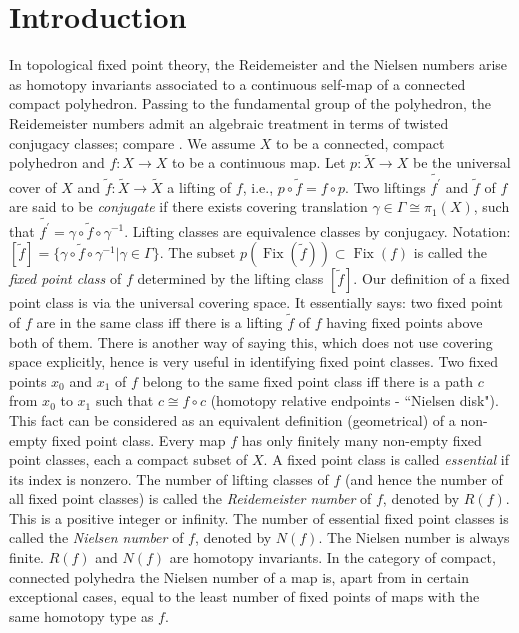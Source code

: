 \documentclass[12pt, a4paper]{amsart}
\DeclareMathOperator{\fix}{Fix}
\begin{document}
\section{Introduction}\label{sec:intro}
In topological fixed point theory,  the Reidemeister and  the Nielsen numbers
arise as homotopy invariants associated to  a continuous
self-map of a connected compact polyhedron.  Passing to the
fundamental group of the polyhedron, the Reidemeister numbers admit an
algebraic treatment in terms of twisted conjugacy classes; compare
\cite{FelshB}.
We assume $X$ to be a connected, compact polyhedron and $f:X\rightarrow X$ to be a continuous map. Let $p:\tilde{X}\rightarrow X$ be the universal cover of $X$ and $\tilde{f}:\tilde{X}\rightarrow \tilde{X}$ a lifting
of $f$, {i.e.,} $p\circ\tilde{f}=f\circ p$.
 Two liftings $\tilde{f^\prime}$ and $\tilde{f}$  of $f$ are said to be \emph{conjugate} if there
 exists covering translation $ \gamma \in \Gamma\cong\pi_1(X)$, such that $\tilde{f^\prime}= \gamma \circ \tilde{f} \circ  \gamma^{-1}.$
Lifting classes are equivalence classes by conjugacy. Notation:
$
[\tilde{f}]= \{ \gamma \circ \tilde{f} \circ  \gamma^{-1}  |\gamma \in \Gamma \}.
$
The subset $p(\fix(\tilde{f}))\subset \fix(f)$ is called the \emph{fixed point class} of $f$ determined by the lifting class $[\tilde{f}]$.
 Our definition of a fixed point class is via the universal covering space. It essentially
 says: two fixed point of $f$ are in the same class iff there is a lifting $\tilde f $ of $f$ having
 fixed points above both of them. There is another way of saying this, which does not use covering space explicitly, hence is  very useful in identifying fixed point classes.
 Two fixed points $x_0$ and $x_1$ of $f$ belong to the same fixed point class iff
 there is a path $c$ from $x_0$ to $x_1$ such that $c \cong f\circ c $ (homotopy relative
    endpoints - ``Nielsen disk").
 This fact  can be considered as an equivalent definition (geometrical) of a non-empty fixed point class. Every map $f$  has only finitely many non-empty fixed point classes, each a compact
 subset of $X$.
 A fixed point class is called \emph{essential} if its index is nonzero. The number of lifting classes of $f$ (and hence the number of all fixed point classes) is called the \emph{Reidemeister number} of $f$, denoted {by} $R(f)$. This is a positive integer or infinity. The number of essential fixed point classes is called the \emph{Nielsen number} of $f$, denoted by $N(f)$.
The Nielsen number is always finite. $R(f)$ and $N(f)$ are homotopy invariants. In the category of compact, connected polyhedra the Nielsen number of a map is, apart from in certain exceptional cases, equal to the least number of fixed points of maps with the same homotopy type as $f$.
\end{document}
